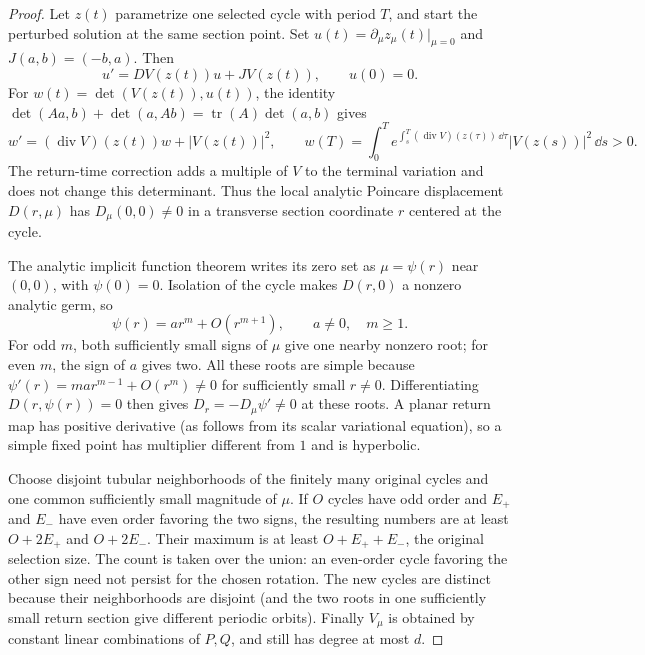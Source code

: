 \begin{proof}
Let $z(t)$ parametrize one selected cycle with period $T$, and start
the perturbed solution at the same section point.  Set
$u(t)=\partial_\mu z_\mu(t)|_{\mu=0}$ and
$J(a,b)=(-b,a)$.  Then
\[
 u'=DV(z(t))u+JV(z(t)),\qquad u(0)=0.
\]
For $w(t)=\det(V(z(t)),u(t))$, the identity
$\det(Aa,b)+\det(a,Ab)=\operatorname{tr}(A)\det(a,b)$ gives
\begin{equation}\label{eq:counting-rotation}
 w'=(\operatorname{div}V)(z(t))w+|V(z(t))|^2,
 \qquad
 w(T)=\int_0^T
 e^{\int_s^T(\operatorname{div}V)(z(\tau))\,\dd\tau}
 |V(z(s))|^2\,\dd s>0.
\end{equation}
The return-time correction adds a multiple of $V$ to the terminal
variation and does not change this determinant.  Thus the local
analytic Poincare displacement $D(r,\mu)$ has
$D_\mu(0,0)\ne0$ in a transverse section coordinate $r$ centered
at the cycle.

The analytic implicit function theorem writes its zero set as
$\mu=\psi(r)$ near $(0,0)$, with $\psi(0)=0$.  Isolation of the
cycle makes $D(r,0)$ a nonzero analytic germ, so
\[
 \psi(r)=a r^m+O(r^{m+1}),\qquad a\ne0,\quad m\ge1.
\]
For odd $m$, both sufficiently small signs of $\mu$ give one
nearby nonzero root; for even $m$, the sign of $a$ gives two.
All these roots are simple because
$\psi'(r)=ma r^{m-1}+O(r^m)\ne0$ for sufficiently small
$r\ne0$.  Differentiating $D(r,\psi(r))=0$ then gives
$D_r=-D_\mu\psi'\ne0$ at these roots.  A planar return map has
positive derivative (as follows from its scalar variational
equation), so a simple fixed point has multiplier different from
$1$ and is hyperbolic.

Choose disjoint tubular neighborhoods of the finitely many original
cycles and one common sufficiently small magnitude of $\mu$.
If $O$ cycles have odd order and $E_+$ and $E_-$ have even order
favoring the two signs, the resulting numbers are at least
$O+2E_+$ and $O+2E_-$.  Their maximum is at least
$O+E_++E_-$, the original selection size.  The count is taken over
the union: an even-order cycle favoring the other sign need not
persist for the chosen rotation.  The new cycles are
distinct because their neighborhoods are disjoint (and the two
roots in one sufficiently small return section give different
periodic orbits).  Finally $V_\mu$ is obtained by constant linear
combinations of $P,Q$, and still has degree at most $d$.
\end{proof}

